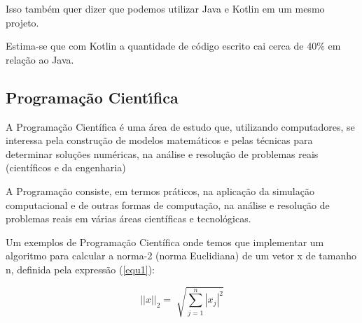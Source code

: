 Isso também quer dizer que podemos utilizar Java e Kotlin em um mesmo projeto.

Estima-se que com Kotlin a quantidade de código escrito
cai cerca de 40\% em relação ao Java. 

\subsection{ Programa\c{c}\~{a}o Cient\'{\i}fica}
A Programação Científica é uma área de estudo que,
utilizando computadores, se interessa pela
construção de modelos matemáticos e pelas técnicas 
para determinar soluções numéricas, na
análise e resolução de problemas reais
(científicos e da engenharia)

A Programação consiste, em termos práticos, na aplicação da 
simulação computacional e de outras formas de
computação, na análise e resolução de problemas 
reais em várias áreas científicas e tecnológicas.

Um exemplos de Programação Científica onde temos que implementar um 
algoritmo para calcular a norma-2 (norma Euclidiana) de um vetor x
de tamanho n, definida pela expressão (\ref*{equ1}):

\begin{center}
   \begin{equation}
      ||x||_{2} = \sqrt[]{\sum^{n}_{j=1} |x_{j}|^{2}}
      \label{equ1}
   \end{equation}
\end{center}